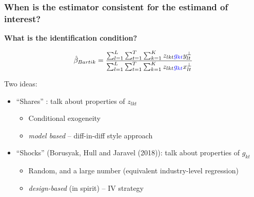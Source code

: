 \documentclass[notes,11pt, aspectratio=169]{beamer}
\begin{document}
\begin{frame}
\frametitle{When is the estimator consistent for the estimand of interest?}
\begin{center}
\textbf{What is the identification condition?}
\end{center}

$$\hat{\beta}_{Bartik}=  \frac{  \sum_{l=1}^L \sum_{t=1}^T \sum_{k=1}^K  z_{lkt} \textcolor{blue}{g_{kt}} y_{lt}^\perp    }{   \sum_{l=1}^L \sum_{t=1}^T \sum_{k=1}^K  z_{lkt} \textcolor{blue}{g_{kt}} x_{lt}^\perp   }  $$

Two ideas:
\begin{itemize}
\item ``Shares'' : talk about properties of $z_{lkt}$
	\begin{itemize}
	\item Conditional exogeneity
        \item \emph{model based} -- diff-in-diff style approach
	\end{itemize}
\item ``Shocks'' (Borusyak, Hull and Jaravel (2018)): talk about properties of $g_{kt}$
	\begin{itemize}
	\item Random, and a large number (equivalent industry-level regression)
        \item \emph{design-based} (in spirit) -- IV strategy
	\end{itemize}
\end{itemize}

\end{frame}
\end{document}
